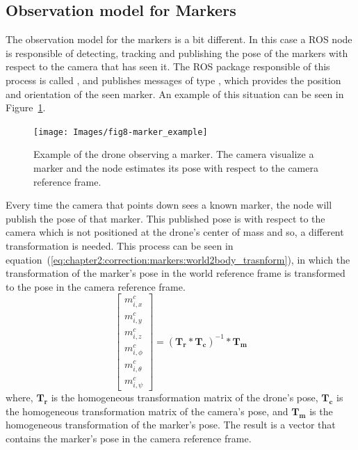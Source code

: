 \subsection{Observation model for Markers}
\label{subsec:chapter2:correction:markers}

The observation model for the markers is a bit different. In this case a \ac{ROS} node is responsible of detecting, tracking and publishing the pose of the markers with respect to the camera that has seen it. The \ac{ROS} package responsible of this process is called , and publishes messages of type , which provides the position and orientation of the seen marker. An example of this situation can be seen in Figure~\ref{fig:chapter2:correction:markers:example}.\\

\begin{figure}
    \centering
    \texttt{[image: Images/fig8-marker\_example]}
    \caption[Example of the drone observing a marker]{Example of the drone observing a marker. The camera visualize a marker and the node  estimates its pose with respect to the camera reference frame.}
    \label{fig:chapter2:correction:markers:example}
\end{figure}

Every time the camera that points down sees a known marker, the  node will publish the pose of that marker. This published pose is with respect to the camera which is not positioned at the drone's center of mass and so, a different transformation is needed. This process can be seen in equation~(\ref{eq:chapter2:correction:markers:world2body_trasnform}), in which the transformation of the marker's pose in the world reference frame is transformed to the pose in the camera reference frame.
\begin{equation}
    \begin{bmatrix}
        m_{i, x}^c \\ m_{i, y}^c \\ m_{i, z}^c \\ m_{i, \phi}^c \\ m_{i, \theta}^c \\ m_{i, \psi}^c
    \end{bmatrix} = (\bm{T_r} * \bm{T_c})^{-1} * \bm{T_m}
    \label{eq:chapter2:correction:markers:world2body_trasnform}
\end{equation}
where, $\bm{T_r}$ is the homogeneous transformation matrix of the drone's pose, $\bm{T_c}$ is the homogeneous transformation matrix of the camera's pose, and $\bm{T_m}$ is the homogeneous transformation of the marker's pose. The result is a vector that contains the marker's pose in the camera reference frame.\\

